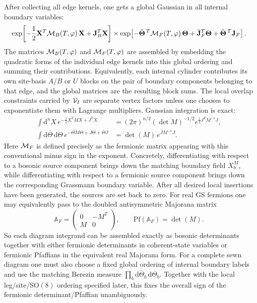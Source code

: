 \documentclass[11pt]{article}
\numberwithin{equation}{section}
\newcommand{\dd}{\mathrm{d}}
\begin{document}
After collecting all edge kernels, one gets a global Gaussian in all internal boundary variables:
\begin{equation}
\label{eq:s8-005}
\exp\!\left[
-\frac12 {\bf X}^T {\cal M}_B(T,\varphi)\,{\bf X}
+{\bf J}_B^T{\bf X}
\right]
\times
\exp\!\left[
-\bar{\bf \Theta}^{\,T}{\cal M}_F(T,\varphi)\,{\bf \Theta}
+\bar{\bf J}_F^T{\bf \Theta}
+\bar{\bf \Theta}^{\,T}{\bf J}_F
\right].
\end{equation}
The matrices ${\cal M}_B(T,\varphi)$ and ${\cal M}_F(T,\varphi)$ are assembled by embedding the quadratic forms of the individual edge kernels into this global ordering and summing their contributions. Equivalently, each internal cylinder contributes its own site-basis $A/B$ or $U$ blocks on the pair of boundary components belonging to that edge, and the global matrices are the resulting block sums. The local overlap constraints carried by ${\cal V}_I$ are separate vertex factors unless one chooses to exponentiate them with Lagrange multipliers.
Gaussian integration is exact:
\begin{align}
\int \dd^nX\,e^{-\frac12 X^TMX+J^TX}
&=(2\pi)^{n/2}(\det M)^{-1/2}e^{\frac12 J^TM^{-1}J},
\label{eq:s8-bosonic-gaussian-integral}\\
\int \dd\bar\Theta\,\dd\Theta\,
e^{-\bar\Theta M\Theta+\bar J\Theta+\bar\Theta J}
&=\det(M)\,e^{\bar J M^{-1}J}.
\label{eq:s8-fermionic-gaussian-integral}
\end{align}
Here ${\cal M}_F$ is defined precisely as the fermionic matrix appearing with this conventional minus sign in the exponent.
Concretely, differentiating with respect to a bosonic source component brings down the matching boundary field $X_b^M$, while differentiating with respect to a fermionic source component brings down the corresponding Grassmann boundary variable. After all desired local insertions have been generated, the sources are set back to zero.
For real GS fermions one may equivalently pass to the doubled antisymmetric Majorana matrix
\begin{equation}
\label{eq:s8-006}
\mathbb A_F=
\begin{pmatrix}
0 & -M^T\\
M & 0
\end{pmatrix},
\qquad
\mathrm{Pf}(\mathbb A_F)=\det(M).
\end{equation}
So each diagram integrand can be assembled exactly as bosonic determinants together with either fermionic determinants in coherent-state variables or fermionic Pfaffians in the equivalent real Majorana form.
For a complete sewn diagram one must also choose a fixed global ordering of internal boundary labels and use the matching Berezin measure $\prod_b \dd\bar\Theta_b\,\dd\Theta_b$. Together with the local leg/site/SO$(8)$ ordering specified later, this fixes the overall sign of the fermionic determinant/Pfaffian unambiguously.
\end{document}
